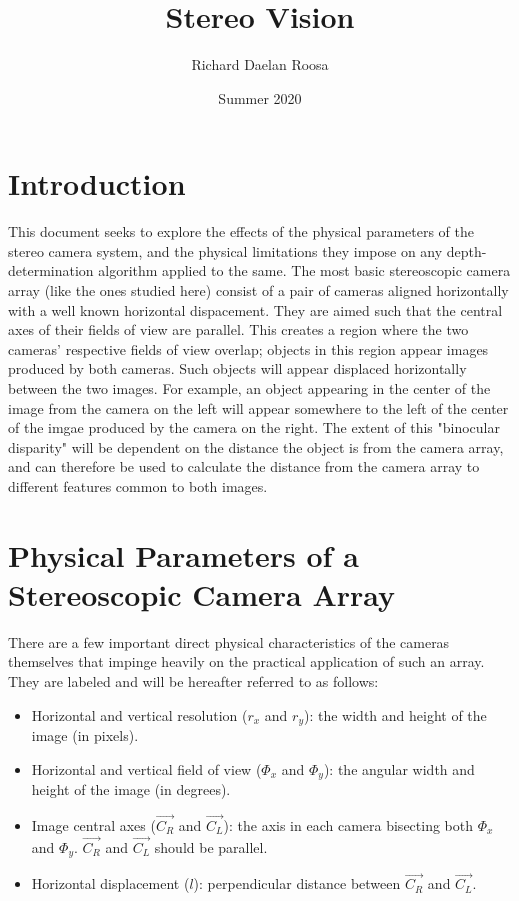 \documentclass{article}
\title{Stereo Vision}
\author{Richard Daelan Roosa}
\date{Summer 2020}
\begin{document}
\maketitle

\section{Introduction}
This document seeks to explore the effects of the physical parameters of the stereo camera system, and the physical limitations they impose on any depth-determination algorithm applied to the same.
The most basic stereoscopic camera array (like the ones studied here) consist of a pair of cameras aligned horizontally with a well known horizontal dispacement.
They are aimed such that the central axes of their fields of view are parallel.
This creates a region where the two cameras' respective fields of view overlap; objects in this region appear images produced by both cameras.
Such objects will appear displaced horizontally between the two images.
For example, an object appearing in the center of the image from the camera on the left will appear somewhere to the left of the center of the imgae produced by the camera on the right.
The extent of this "binocular disparity" will be dependent on the distance the object is from the camera array, and can therefore be used to calculate the distance from the camera array to different features common to both images.

\section{Physical Parameters of a Stereoscopic Camera Array}
There are a few important direct physical characteristics of the cameras themselves that impinge heavily on the practical application of such an array.
They are labeled and will be hereafter referred to as follows:

\begin{itemize}
    \item Horizontal and vertical resolution ($r_x$ and $r_y$): the width and height of the image (in pixels). 
    \item Horizontal and vertical field of view ($\Phi_x$ and $\Phi_y$): the angular width and height of the image (in degrees).
    \item Image central axes ($\vec{C_R}$ and $\vec{C_L}$): the axis in each camera bisecting both $\Phi_x$ and $\Phi_y$. $\vec{C_R}$ and $\vec{C_L}$ should be parallel.
    \item Horizontal displacement ($l$): perpendicular distance between $\vec{C_R}$ and $\vec{C_L}$.
\end{itemize}
\end{document}
